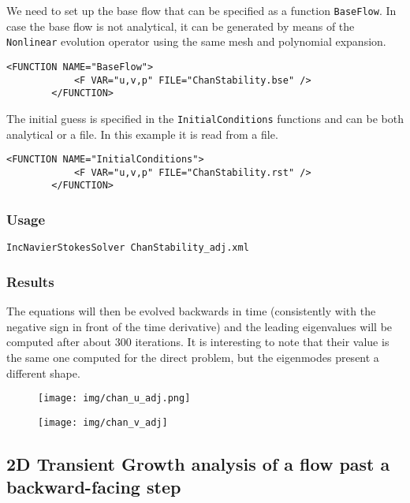 We need to set up the base flow that can be specified as a function \texttt{BaseFlow}. In case the base flow is not analytical, it can be generated by means of the \texttt{Nonlinear} evolution operator using the same mesh and polynomial expansion.

    \begin{lstlisting}[style=XMLStyle]
        <FUNCTION NAME="BaseFlow">
            <F VAR="u,v,p" FILE="ChanStability.bse" />
        </FUNCTION>
  \end{lstlisting}

  The initial guess is specified in the \texttt{InitialConditions} functions and can be both analytical or a file. In this example it is read from a file.

      \begin{lstlisting}[style=XMLStyle]
        <FUNCTION NAME="InitialConditions">
            <F VAR="u,v,p" FILE="ChanStability.rst" />
        </FUNCTION>
          \end{lstlisting}

\subsubsection{Usage}

\texttt{IncNavierStokesSolver ChanStability\_adj.xml}

\subsubsection{Results}

The equations will then be evolved backwards in time (consistently with the negative sign in front of the time derivative) and the leading eigenvalues will be computed after about 300 iterations. It is interesting to note that their value is the same one computed for the direct problem, but the eigenmodes present a different shape.


\begin{figure}[!htbp]
\centering
 {\texttt{[image: img/chan\_u\_adj.png]}}
   \caption {}
\end{figure}

\begin{figure}[!htbp]
\centering
 {\texttt{[image: img/chan\_v\_adj]}}
    \caption {}
\end{figure}

\subsection{2D Transient Growth analysis of a flow past a backward-facing step}

